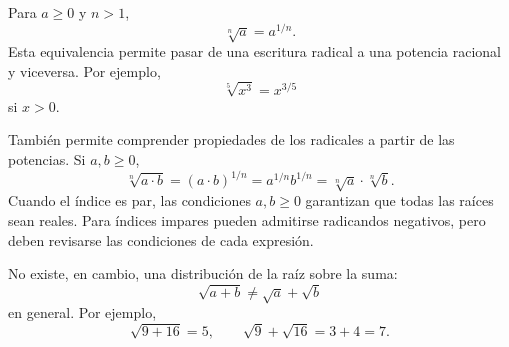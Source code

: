 Para \(a\ge0\) y \(n>1\),
\[
\sqrt[n]{a}=a^{1/n}.
\]
Esta equivalencia permite pasar de una escritura radical a una potencia racional y viceversa. Por ejemplo,
\[
\sqrt[5]{x^3}=x^{3/5}
\]
si \(x>0\).

También permite comprender propiedades de los radicales a partir de las potencias. Si \(a,b\ge0\),
\[
\sqrt[n]{a\cdot b}
=(a\cdot b)^{1/n}
=a^{1/n}b^{1/n}
=\sqrt[n]{a}\cdot\sqrt[n]{b}.
\]
Cuando el índice es par, las condiciones \(a,b\ge0\) garantizan que todas las raíces sean reales. Para índices impares pueden admitirse radicandos negativos, pero deben revisarse las condiciones de cada expresión.

No existe, en cambio, una distribución de la raíz sobre la suma:
\[
\sqrt{a+b}\ne\sqrt a+\sqrt b
\]
en general. Por ejemplo,
\[
\sqrt{9+16}=5,
\qquad
\sqrt9+\sqrt{16}=3+4=7.
\]
